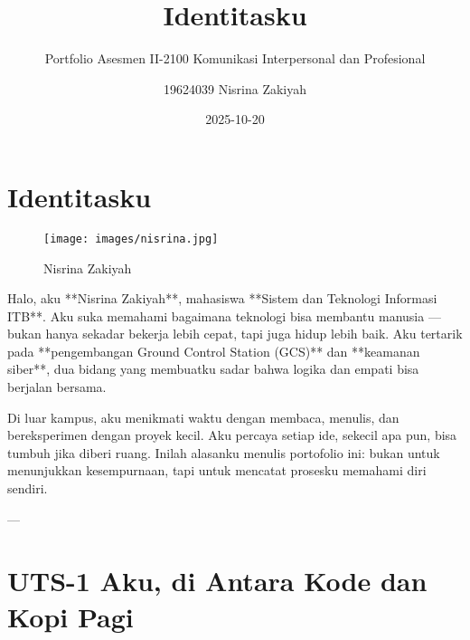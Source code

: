 
\title{Identitasku}
\subtitle{Portfolio Asesmen II-2100 Komunikasi Interpersonal dan Profesional}
\author{19624039 Nisrina Zakiyah}
\date{2025-10-20}


\maketitle

\renewcommand*\contentsname{Daftar Isi}
{
\hypersetup{linkcolor=}
\setcounter{tocdepth}{2}
\tableofcontents
}


\chapter*{Identitasku}\label{identitasku}


\begin{figure}[H]
{\centering \texttt{[image: images/nisrina.jpg]}}
\caption{Nisrina Zakiyah}
\end{figure}

Halo, aku **Nisrina Zakiyah**, mahasiswa **Sistem dan Teknologi Informasi ITB**.  
Aku suka memahami bagaimana teknologi bisa membantu manusia — bukan hanya sekadar bekerja lebih cepat, tapi juga hidup lebih baik.  
Aku tertarik pada **pengembangan Ground Control Station (GCS)** dan **keamanan siber**, dua bidang yang membuatku sadar bahwa logika dan empati bisa berjalan bersama.  

Di luar kampus, aku menikmati waktu dengan membaca, menulis, dan bereksperimen dengan proyek kecil.  
Aku percaya setiap ide, sekecil apa pun, bisa tumbuh jika diberi ruang.  
Inilah alasanku menulis portofolio ini: bukan untuk menunjukkan kesempurnaan, tapi untuk mencatat prosesku memahami diri sendiri.

---


\chapter{UTS-1 Aku, di Antara Kode dan Kopi Pagi}\label{uts-1}

